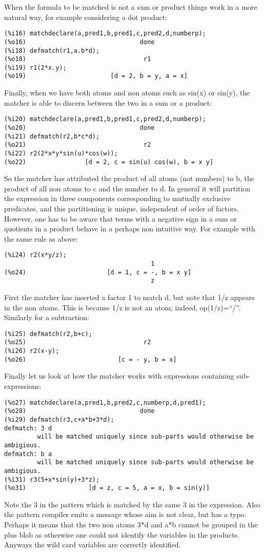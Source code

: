 \documentclass[a4paper,11pt]{article}
\begin{document}
When the formula to be matched is not a
sum or product things work in a more natural way, for example
considering a dot product:
\begin{verbatim}
(%i16) matchdeclare(a,pred1,b,pred1,c,pred2,d,numberp);
(%o16)                               done
(%i18) defmatch(r1,a.b*d);
(%o18)                                r1
(%i19) r1(2*x.y);
(%o19)                       [d = 2, b = y, a = x]
\end{verbatim}

Finally, when we have both atoms and non atoms such as sin(x) or sin(y),
the matcher is able to discern between the two in a sum or a product:
\begin{verbatim}
(%i20) matchdeclare(a,pred1,b,pred1,c,pred2,d,numberp);
(%o20)                               done
(%i21) defmatch(r2,b*c*d);
(%o21)                                r2
(%i22) r2(2*x*y*sin(u)*cos(w));
(%o22)                [d = 2, c = sin(u) cos(w), b = x y]
\end{verbatim}
So the matcher has attributed the product of all atoms (not numbers)
to b, the product of all non atoms to c and the number to d. In general
it will partition the expression in three components corresponding to
mutually exclusive predicates, and this partitioning is unique, 
independent of order of factors. However, one has to be aware that
terms with a negative sign in a sum or quotients in a product behave
in a perhaps non intuitive way. For example with the same rule as above:
\begin{verbatim}
(%i24) r2(x*y/z);
                                        1
(%o24)                      [d = 1, c = -, b = x y]
                                        z
\end{verbatim}
First the matcher has inserted a factor 1 to match d, but note that 1/z
appears in the non atoms. This is because 1/z is not an atom; 
indeed, op(1/z)=``/''. Similarly for a subtraction:
\begin{verbatim}
(%i25) defmatch(r2,b+c);
(%o25)                                r2
(%i26) r2(x-y);
(%o26)                         [c = - y, b = x]
\end{verbatim}
Finally let us look at how the matcher works with expressions
containing sub-expressions:
\begin{verbatim}
(%o27) matchdeclare(a,pred1,b,pred2,c,numberp,d,pred1);
(%o28)                               done
(%i29) defmatch(r3,c+a*b+3*d);
defmatch: 3 d
         will be matched uniquely since sub-parts would otherwise be ambigious.
defmatch: b a
         will be matched uniquely since sub-parts would otherwise be ambigious.
(%i31) r3(5+x*sin(y)+3*z);
(%o31)                 [d = z, c = 5, a = x, b = sin(y)]
\end{verbatim}
Note the 3 in the pattern which is matched by the same 3 in the expression. Also
the pattern compiler emits a message whose aim is not clear, but has a typo.
Perhaps it means that the two non atoms 3*d and a*b cannot be grouped in the
plus blob as otherwise one could not identify the variables
in the products. Anyways the wild card variables are correctly identified.
\end{document}
